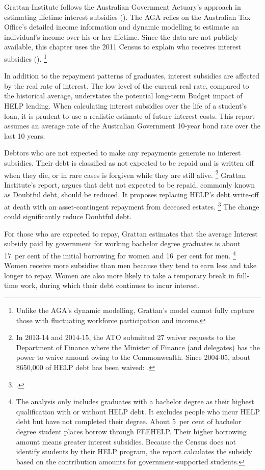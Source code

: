 \documentclass[embargoed]{grattan}
\begin{document}
Grattan Institute follows the Australian Government Actuary's approach in estimating lifetime interest subsidies ().
The \gls{AGA} relies on the Australian Tax Office's detailed income information and dynamic modelling to estimate an individual's income over his or her lifetime.
Since the data are not publicly available, this chapter uses the 2011 Census to explain who receives interest subsidies ().%
\footnote{Unlike the \gls{AGA}'s dynamic modelling, Grattan's model cannot fully capture those with fluctuating workforce participation and income.} \afterpage{\clearpage}

In addition to the repayment patterns of graduates, interest subsidies are affected by the real rate of interest.
The low level of the current real rate, compared to the historical average, understates the potential long-term Budget impact of \gls{HELP} lending.
When calculating interest subsidies over the life of a student's loan, it is prudent to use a realistic estimate of future interest costs.
This report assumes an average rate of the Australian Government 10-year bond rate over the last 10 years.


Debtors who are not expected to make any repayments generate no interest subsidies.
Their debt is classified as not expected to be repaid and is written off when they die, or in rare cases is forgiven while they are still alive.%
\footnote{In 2013-14 and 2014-15, the \gls{ATO} submitted 27 waiver requests to the Department of Finance where the Minister of Finance (and delegates) has the power to waive amount owing to the Commonwealth.
Since 2004-05, about \$650,000 of \gls{HELP} debt has been waived: \textcite[][38]{ANAO2016AdministrationHigherEducation}.} Grattan Institute's \citeyear{Norton2014Doubtfuldebtrising} report,  argues that debt not expected to be repaid, commonly known as \gls{Doubtful debt}, should be reduced.
It proposes replacing \gls{HELP}'s debt write-off at death with an asset-contingent repayment from deceased estates.%
\footcite{Norton2014Doubtfuldebtrising} 
The change could significantly reduce \gls{Doubtful debt}.

For those who are expected to repay, Grattan estimates that the average \gls{Interest subsidy} paid by government for working bachelor degree graduates is about 17~per cent of the initial borrowing for women and 16~per cent for men.%
\footnote{The analysis only includes graduates with a bachelor degree as their highest qualification with or without \gls{HELP} debt.
It excludes people who incur \gls{HELP} debt but have not completed their degree.
About 5~per cent of bachelor degree student places borrow through \gls{FEEHELP}\@.
Their higher borrowing amount means greater interest subsidies. Because the Census does not identify students by their \gls{HELP} program, the report calculates the subsidy based on the contribution amounts for government-supported students.}
Women receive more subsidies than men because they tend to earn less and take longer to repay.
Women are also more likely to take a temporary break in full-time work, during which their debt continues to incur interest.
\end{document}

